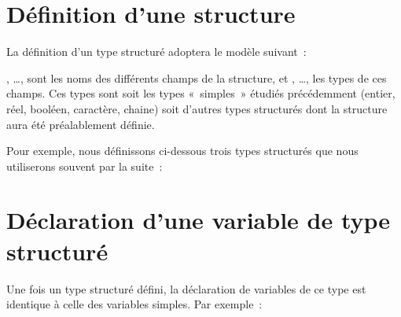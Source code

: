 \section{Définition d'une structure}

	La définition d’un type structuré adoptera le modèle suivant~:


	, \dots, 
	sont les noms des différents champs de la structure, 
	et , \dots,  
	les types de ces champs. 
	Ces types sont soit les types «~simples~» étudiés
	précédemment (entier, réel, booléen, caractère, chaine) soit d’autres
	types structurés dont la structure aura été préalablement définie.

	Pour exemple, nous définissons ci-dessous trois
	types structurés que nous utiliserons souvent par la suite~:




\section{Déclaration d’une variable de type structuré}

	Une fois un type structuré défini, la
	déclaration de variables de ce type est identique à celle des variables
	simples. Par exemple~:

